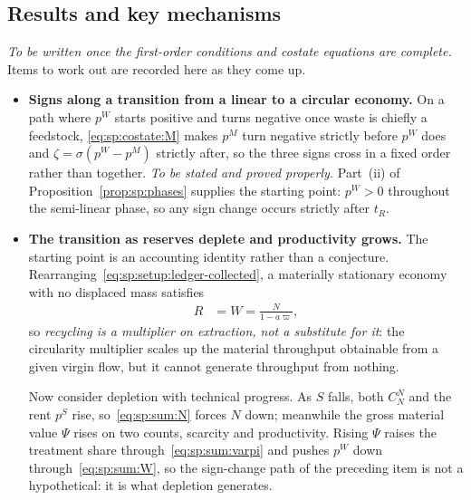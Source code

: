 \subsection{Results and key mechanisms}\label{sec:sp:opt:results}

\emph{To be written once the first-order conditions and costate equations are complete.} Items to work out are recorded here as they come up.

\begin{itemize}
\item \textbf{Signs along a transition from a linear to a circular economy.} On a path where $p^W$ starts positive and turns negative once waste is chiefly a feedstock, \eqref{eq:sp:costate:M} makes $p^M$ turn negative strictly before $p^W$ does and $\zeta=\sigma\left(p^W-p^M\right)$ strictly after, so the three signs cross in a fixed order rather than together. \emph{To be stated and proved properly.} Part~(ii) of Proposition~\ref{prop:sp:phases} supplies the starting point: $p^W>0$ throughout the semi-linear phase, so any sign change occurs strictly after $t_R$.

\item \textbf{The transition as reserves deplete and productivity grows.} The starting point is an accounting identity rather than a conjecture. Rearranging~\eqref{eq:sp:setup:ledger-collected}, a materially stationary economy with no displaced mass satisfies
\begin{align}
R &= W = \frac{N}{1-a\varpi},
\label{eq:sp:multiplier-identity}
\end{align}
so \emph{recycling is a multiplier on extraction, not a substitute for it}: the circularity multiplier scales up the material throughput obtainable from a given virgin flow, but it cannot generate throughput from nothing.

Now consider depletion with technical progress. As $S$ falls, both $C^N_N$ and the rent $p^S$ rise, so~\eqref{eq:sp:sum:N} forces $N$ down; meanwhile the gross material value $\Psi$ rises on two counts, scarcity and productivity. Rising $\Psi$ raises the treatment share through~\eqref{eq:sp:sum:varpi} and pushes $p^W$ down through~\eqref{eq:sp:sum:W}, so the sign-change path of the preceding item is not a hypothetical: it is what depletion generates.


\end{itemize}

